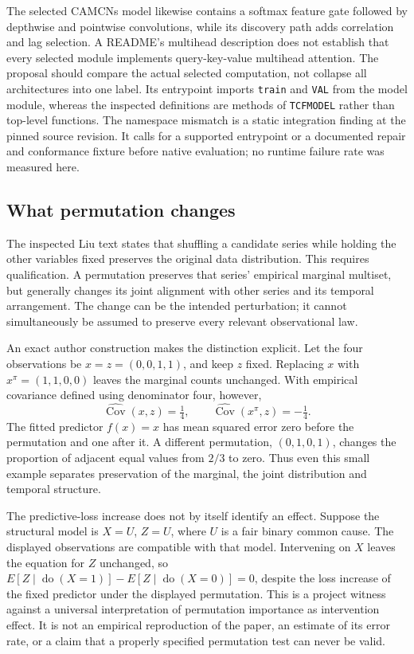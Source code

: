 The selected CAMCNs model likewise contains a softmax feature gate followed by depthwise and
pointwise convolutions, while its discovery path adds correlation and lag selection. A README's
multihead description does not establish that every selected module implements query-key-value
multihead attention. The proposal should compare the actual selected computation, not collapse
all architectures into one label. Its entrypoint imports \texttt{train} and \texttt{VAL} from the
model module, whereas the inspected definitions are methods of \texttt{TCFMODEL} rather than
top-level functions. The namespace mismatch is a static integration finding at the pinned
source revision. It calls for a supported entrypoint or a documented repair and conformance
fixture before native evaluation; no runtime failure rate was measured here.
\citep{exec28_at_camcns}

\subsection{What permutation changes}
The inspected Liu text states that shuffling a candidate series while holding the other variables
fixed preserves the original data distribution. This requires qualification. A permutation
preserves that series' empirical marginal multiset, but generally changes its joint alignment
with other series and its temporal arrangement. The change can be the intended perturbation;
it cannot simultaneously be assumed to preserve every relevant observational law.
\citep{exec28_at_liu}

An exact author construction makes the distinction explicit. Let the four observations be
$x=z=(0,0,1,1)$, and keep $z$ fixed. Replacing $x$ with
$x^\pi=(1,1,0,0)$ leaves the marginal counts unchanged. With empirical covariance defined using
denominator four, however,
\[
 \widehat{\operatorname{Cov}}(x,z)=\tfrac14,
 \qquad \widehat{\operatorname{Cov}}(x^\pi,z)=-\tfrac14.
\]
The fitted predictor $f(x)=x$ has mean squared error zero before the permutation and one
after it. A different permutation, $(0,1,0,1)$, changes the proportion of adjacent equal values
from $2/3$ to zero. Thus even this small example separates preservation of the marginal,
the joint distribution and temporal structure.\citep{exec28_at_reference}

The predictive-loss increase does not by itself identify an effect. Suppose the structural model
is $X=U$, $Z=U$, where $U$ is a fair binary common cause. The displayed observations are compatible
with that model. Intervening on $X$ leaves the equation for $Z$ unchanged, so
$E[Z\mid\operatorname{do}(X=1)]-E[Z\mid\operatorname{do}(X=0)]=0$, despite the loss increase of
the fixed predictor under the displayed permutation. This is a project witness against a
universal interpretation of permutation importance as intervention effect. It is not an
empirical reproduction of the paper, an estimate of its error rate, or a claim that a properly
specified permutation test can never be valid.\citep{exec28_at_reference}

